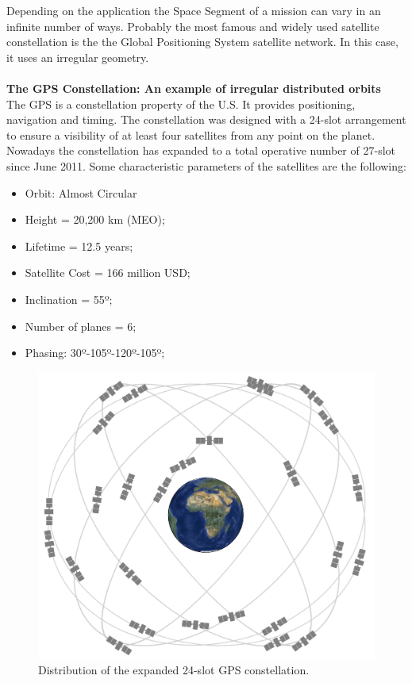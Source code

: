 Depending on the application the Space Segment of a mission can vary in an infinite number of ways. Probably the most famous and widely used satellite constellation is the the Global Positioning System satellite network. In this case, it uses an irregular geometry.
\\
\\
\textbf{The GPS Constellation: An example of irregular distributed orbits \cite{GPS}}
\\
The GPS is a constellation property of the U.S. It provides positioning, navigation and timing. The constellation was designed with a 24-slot arrangement to ensure a visibility of at least four satellites from any point on the planet. Nowadays the constellation has expanded to a total operative number of 27-slot since June 2011. Some characteristic parameters of the satellites are the following:

\begin{itemize}
\item Orbit: Almost Circular
\item Height = 20,200 km (MEO);
\item Lifetime = 12.5 years;
\item Satellite Cost = 166 million USD;
\item Inclination = 55º;
\item Number of planes = 6;
\item Phasing: 30º-105º-120º-105º;
\end{itemize}

\begin{figure}[H]
\begin{center}
\includegraphics[scale=0.16]{GPSconstellation.jpg}
\caption{Distribution of the expanded 24-slot GPS constellation.\cite{GPS}}
\end{center}
\end{figure}